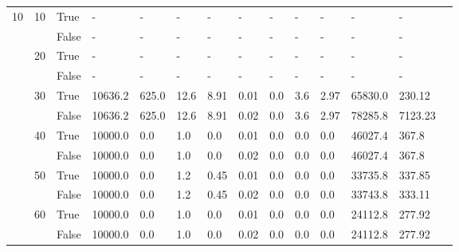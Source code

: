 \begin{landscape}
\begin{small}
\begin{longtable}[c]{@{}lll|ll|ll|ll|ll|lll@{}}
  \midrule
10 & 10 & True  & -               & -              & -             & -             & -             & -             & -             & -             & -             & -           &  \\
   &    & False & -               & -              & -             & -             & -             & -             & -             & -             & -             & -           &  \\
   & 20 & True  & -               & -              & -             & -             & -             & -             & -             & -             & -             & -           &  \\
   &    & False & -               & -              & -             & -             & -             & -             & -             & -             & -             & -           &  \\
   & 30 & True  & 10636.2         & 625.0          & 12.6          & 8.91          & 0.01          & 0.0           & 3.6           & 2.97          & 65830.0       & 230.12      &  \\
   &    & False & 10636.2         & 625.0          & 12.6          & 8.91          & 0.02          & 0.0           & 3.6           & 2.97          & 78285.8       & 7123.23     &  \\
   & 40 & True  & 10000.0         & 0.0            & 1.0           & 0.0           & 0.01          & 0.0           & 0.0           & 0.0           & 46027.4       & 367.8       &  \\
   &    & False & 10000.0         & 0.0            & 1.0           & 0.0           & 0.02          & 0.0           & 0.0           & 0.0           & 46027.4       & 367.8       &  \\
   & 50 & True  & 10000.0         & 0.0            & 1.2           & 0.45          & 0.01          & 0.0           & 0.0           & 0.0           & 33735.8       & 337.85      &  \\
   &    & False & 10000.0         & 0.0            & 1.2           & 0.45          & 0.02          & 0.0           & 0.0           & 0.0           & 33743.8       & 333.11      &  \\
   & 60 & True  & 10000.0         & 0.0            & 1.0           & 0.0           & 0.01          & 0.0           & 0.0           & 0.0           & 24112.8       & 277.92      &  \\
   &    & False & 10000.0         & 0.0            & 1.0           & 0.0           & 0.02          & 0.0           & 0.0           & 0.0           & 24112.8       & 277.92      &  \\

\end{longtable}
\end{small}
\end{landscape}
